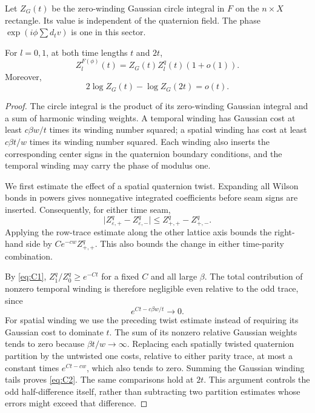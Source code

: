 Let $Z_G(t)$ be the zero-winding Gaussian circle integral in $F$ on the
$n\times X$ rectangle. Its value is independent of the quaternion field.
The phase $\exp(i\phi\sum d_t v)$ is one in this sector.

\begin{lemma}
\label{lem:assembly-circle}
For $l=0,1$, at both time lengths $t$ and $2t$,
\begin{equation}
 Z_l^{F(\phi)}(t)=Z_G(t)Z_l^q(t)(1+o(1)).
 \label{eq:C2}
\end{equation}
Moreover,
\begin{equation}
 2\log Z_G(t)-\log Z_G(2t)=o(t).
 \label{eq:C3}
\end{equation}
\end{lemma}

\begin{proof}
The circle integral is the product of its zero-winding Gaussian integral
and a sum of harmonic winding weights. A temporal winding has Gaussian
cost at least $c\beta w/t$ times its winding number squared; a spatial
winding has cost at least $c\beta t/w$ times its winding number squared.
Each winding also inserts the corresponding center signs in the
quaternion boundary conditions, and the temporal winding may carry the
phase of modulus one.

We first estimate the effect of a spatial quaternion twist. Expanding
all Wilson bonds in powers gives nonnegative integrated coefficients
before seam signs are inserted. Consequently, for either time seam,
\[
 \bigl|Z^q_{\varepsilon,+}-Z^q_{\varepsilon,-}\bigr|
      \le Z^q_{+,+}-Z^q_{+,-}.
\]
Applying the row-trace estimate along the other lattice axis bounds the
right-hand side by $Ce^{-cw}Z^q_{+,+}$. This also bounds the change in
either time-parity combination.

By \eqref{eq:C1}, $Z_1^q/Z_0^q\ge e^{-Ct}$ for a fixed $C$ and all
large $\beta$. The total contribution of nonzero temporal winding is
therefore negligible even relative to the odd trace, since
\[
 e^{Ct-c\beta w/t}\longrightarrow0.
\]
For spatial winding we use the preceding twist estimate instead of
requiring its Gaussian cost to dominate $t$. The sum of its nonzero
relative Gaussian weights tends to zero because $\beta t/w\to\infty$.
Replacing each spatially twisted quaternion partition by the untwisted
one costs, relative to either parity trace, at most a constant times
$e^{Ct-cw}$, which also tends to zero. Summing the Gaussian winding tails
proves \eqref{eq:C2}. The same comparisons hold at $2t$. This argument
controls the odd half-difference itself, rather than subtracting two
partition estimates whose errors might exceed that difference.


\end{proof}

